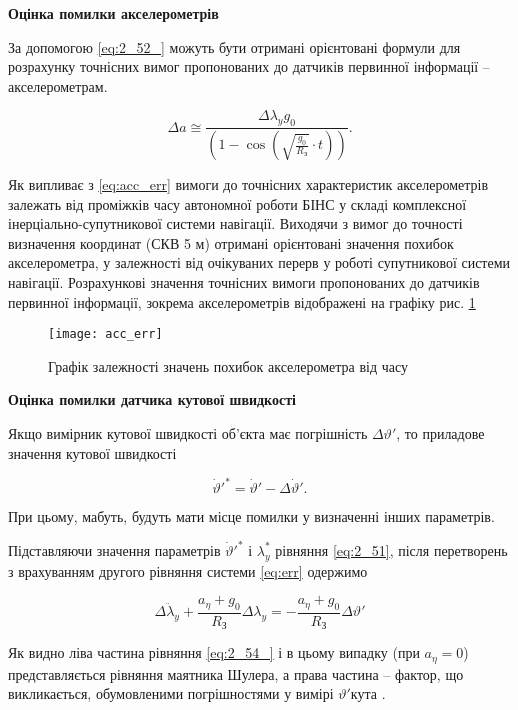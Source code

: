 \textbf{Оцінка помилки акселерометрів}

За допомогою \eqref{eq:2_52_} можуть бути отримані орієнтовані формули для розрахунку точнісних вимог пропонованих до датчиків первинної 
інформації -- акселерометрам.

\begin{equation} 
\label{eq:acc_err} 
\Delta a\cong \frac{\Delta \lambda _{y} g_{0} }{\left(1-\cos \left(\sqrt{\frac{g_{0} }{R_{{\text{З}}} } } \cdot t\right)\right)}.    
\end{equation} 

Як випливає з \eqref{eq:acc_err} вимоги до точнісних характеристик акселерометрів залежать від проміжків часу 
автономної роботи БІНС у складі комплексної інерціально-супутникової системи навігації. Виходячи з вимог до 
точності визначення координат (СКВ  5 м) отримані орієнтовані значення похибок акселерометра, у залежності 
від очікуваних перерв у роботі супутникової системи навігації. Розрахункові значення точнісних вимоги 
пропонованих до датчиків первинної інформації, зокрема акселерометрів відображені на графіку рис. \ref{fig:acc_err} 

\begin{figure}
\centering
\texttt{[image: acc\_err]}
\caption{Графік залежності значень похибок акселерометра від часу}
\label{fig:acc_err}
\end{figure} 




\textbf{Оцінка помилки датчика кутової швидкості}

Якщо вимірник кутової швидкості об'єкта має погрішність $\Delta \vartheta '$, то приладове значення кутової швидкості

\[\dot{\vartheta }'^{*} =\dot{\vartheta }'-\Delta \dot{\vartheta }'.\] 

При цьому, мабуть, будуть мати місце помилки у визначенні інших параметрів.

Підставляючи значення параметрів $\dot{\vartheta }'^{*} $ і  $\lambda _{y}^{*} $ рівняння \eqref{eq:2_51},  
після перетворень з врахуванням другого рівняння системи \eqref{eq:err} одержимо

\begin{equation} 
\label{eq:2_54_} 
\Delta \ddot{\lambda }_{y} +\frac{a_{\eta } +g_{0} }{R_{\text{З}} } \Delta \lambda _{y} =-\frac{a_{\eta } +g_{0} }{R_{\text{З}} } \Delta \vartheta ' 
\end{equation} 

Як видно ліва частина рівняння \eqref{eq:2_54_} і в цьому випадку (при $a_{\eta } =0$) представляється рівняння 
маятника Шулера, а права частина -- фактор, що викликається, обумовленими погрішностями у вимірі $\vartheta '$кута .

